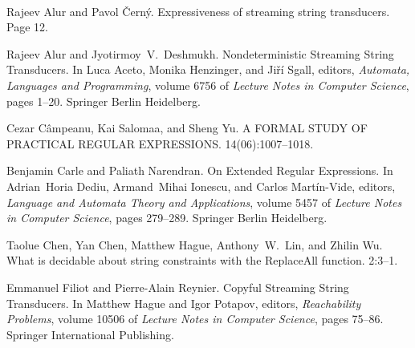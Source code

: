 \documentclass{article}
\newcommand{\tmtextit}[1]{{\itshape{#1}}}
\begin{document}
\

\begin{thebibliography}{1}
  Rajeev Alur  and  Pavol
  {\v C}ern{\'y}. {\newblock}Expressiveness of streaming string transducers.
  {\newblock}Page  12.{\newblock}
  
  Rajeev Alur  and 
  Jyotirmoy~V.~Deshmukh. {\newblock}Nondeterministic Streaming String
  Transducers. {\newblock}In  Luca Aceto, Monika Henzinger, and  Ji{\v r}{\'i}
  Sgall, editors, \tmtextit{Automata, Languages and Programming},  volume 
  6756  of \tmtextit{Lecture Notes in Computer Science},  pages  1--20.
  Springer Berlin Heidelberg.{\newblock}
  
  Cezar C{\^a}mpeanu, Kai
  Salomaa, and  Sheng Yu. {\newblock}A FORMAL STUDY OF PRACTICAL REGULAR
  EXPRESSIONS. {\newblock}14(06):1007--1018.{\newblock}
  
  Benjamin Carle  and  Paliath
  Narendran. {\newblock}On Extended Regular Expressions. {\newblock}In 
  Adrian~Horia Dediu, Armand~Mihai Ionescu, and  Carlos Mart{\'i}n-Vide,
  editors, \tmtextit{Language and Automata Theory and Applications},  volume 
  5457  of \tmtextit{Lecture Notes in Computer Science},  pages  279--289.
  Springer Berlin Heidelberg.{\newblock}
  
  Taolue Chen, Yan Chen, Matthew
  Hague, Anthony~W.~Lin, and  Zhilin Wu. {\newblock}What is decidable about
  string constraints with the ReplaceAll function.
  {\newblock}2:3--1.{\newblock}
  
  Emmanuel Filiot  and 
  Pierre-Alain Reynier. {\newblock}Copyful Streaming String Transducers.
  {\newblock}In  Matthew Hague  and  Igor Potapov, editors,
  \tmtextit{Reachability Problems},  volume  10506  of \tmtextit{Lecture Notes
  in Computer Science},  pages  75--86. Springer International
  Publishing.{\newblock}
\end{thebibliography}
\end{document}
